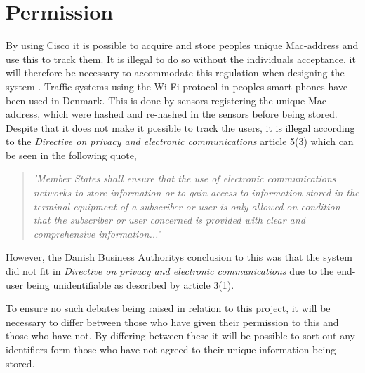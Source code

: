 \section{Permission}
By using Cisco it is possible to acquire and store peoples unique Mac-address and use this to track them. It is illegal to do so without the individuals acceptance, it will therefore be necessary to accommodate this regulation when designing the system \cite{TrafficIlligal}.
Traffic systems using the Wi-Fi protocol in peoples smart phones have been used in Denmark. This is done by sensors registering the unique Mac-address, which were hashed and re-hashed in the sensors before being stored. Despite that it does not make it possible to track the users\cite{TrafficIlligal}, it is illegal according to the \textit{Directive on privacy and electronic communications} article 5(3)\cite{CookieDirective} which can be seen in the following quote,

\begin{quote}
\textit{'Member States shall ensure that the use of electronic communications networks to store information or to gain access to information stored in the terminal equipment of a subscriber or user is only allowed on condition that the subscriber or user concerned is provided with clear and comprehensive information...'}
\end{quote}

However, the Danish Business Authoritys conclusion to this was that the system did not fit in \textit{Directive on privacy and electronic communications} due to the end-user being unidentifiable\cite{TrafficOK} as described by article 3(1)\cite{CookieDirective}.

To ensure no such debates being raised in relation to this project, it will be necessary to differ between those who have given their permission to this and those who have not. By differing between these it will be possible to sort out any identifiers form those who have not agreed to their unique information being stored.
